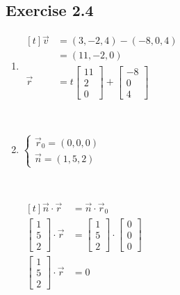 \documentclass[11pt,fleqn]{book} %
\begin{document}
\subsection*{Exercise 2.4}

\begin{enumerate}
    \item
    $\begin{aligned}[t]
        \vec{v} 
        & =(3, -2, 4) - (-8, 0, 4)                                                                   \\
        & = (11, -2, 0)
        \\
        \vec{r} 
        & = t\begin{bmatrix} 11 \\ 2 \\ 0 \end{bmatrix} + \begin{bmatrix} -8 \\ 0 \\ 4 \end{bmatrix}
    \end{aligned}$

    {~~~}

    \item
    $\begin{cases}
        \vec{r}_0 = (0, 0, 0) \\
        \vec{n} = (1, 5, 2)
    \end{cases}$

    {~~~}

    $\begin{aligned}[t]
        \vec{n} \cdot \vec{r}                                   
        & = \vec{n} \cdot \vec{r}_0                                                                   \\
        \begin{bmatrix} 1 \\ 5 \\ 2 \end{bmatrix} \cdot \vec{r} 
        & = \begin{bmatrix} 1 \\ 5 \\ 2 \end{bmatrix} \cdot \begin{bmatrix} 0 \\ 0 \\ 0 \end{bmatrix} \\
        \begin{bmatrix} 1 \\ 5 \\ 2 \end{bmatrix} \cdot \vec{r} 
        & = 0
    \end{aligned}$


\end{enumerate}
\end{document}
